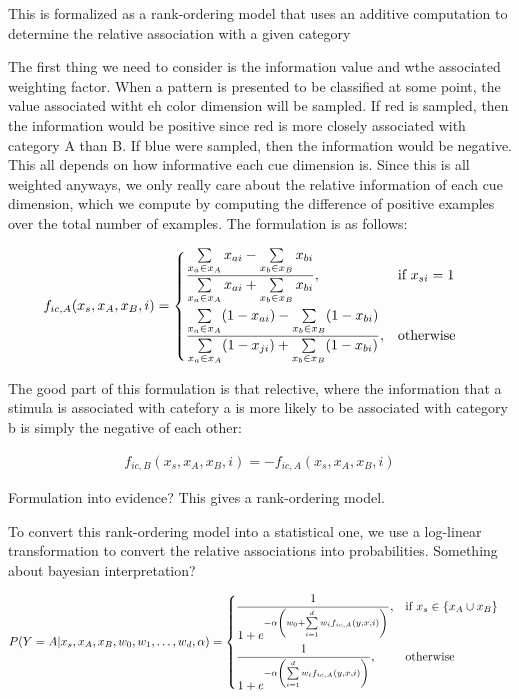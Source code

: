 \documentclass{article}
\begin{document}
This is formalized as a rank-ordering model that uses an additive computation to determine the relative association with a given category

The first thing we need to consider is the information value and wthe associated weighting factor. When a pattern is presented to be classified at some point, the value associated witht eh color dimension will be sampled. If red is sampled, then the information would be positive since red is more closely associated with category A than B. If blue were sampled, then the information would be negative. This all depends on how informative each cue dimension is. Since this is all weighted anyways, we only really care about the relative information of each cue dimension, which we compute by computing the difference of positive examples over the total number of examples. The formulation is as follows:

\begin{align}
    f_{ic,A}(x_s, x_A, x_B, i) &=
        \begin{dcases}
            \frac{\sum\limits_{x_a \in x_A} x_{ai} - \sum\limits_{x_b \in x_B} x_{bi}} {\sum\limits_{x_a \in x_A} x_{ai} + \sum\limits_{x_b \in x_B} x_{bi}}, & \text{if } x_{si} = 1 \\
            \frac{\sum\limits_{x_a \in x_A} (1-x_{ai}) - \sum\limits_{x_b \in x_B} (1-x_{bi})} {\sum\limits_{x_a \in x_A} (1-x_{ji}) + \sum\limits_{x_b \in x_B} (1-x_{bi})}, & \text{otherwise }
        \end{dcases}
\end{align}

The good part of this formulation is that relective, where the information that a stimula is associated with catefory a is more likely to be associated with category b is simply the negative of each other:

\begin{align}
f_{ic,B}(x_s, x_A, x_B, i) = -f_{ic,A}(x_s, x_A, x_B, i)
\end{align}

Formulation into evidence? This gives a rank-ordering model.

To convert this rank-ordering model into a statistical one, we use a log-linear transformation to convert the relative associations into probabilities. Something about bayesian interpretation?

\begin{align}
    P(Y=A| x_s, x_A, x_B, w_0, w_1, \dots, w_d, \alpha) &=
        \begin{dcases}
            \frac{1}{1 + e^{-\alpha \left(w_0 + \sum \limits_{i=1}^d w_i f_{ic,A}(y, x, i)\right)}}, & \text{if } x_s \in \{x_A \cup x_B\}\\
            \frac{1}{1 + e^{-\alpha \left(\sum \limits_{i=1}^d w_i f_{ic,A}(y, x, i)\right)}}, & \text{otherwise }
        \end{dcases}
\end{align}
\end{document}
